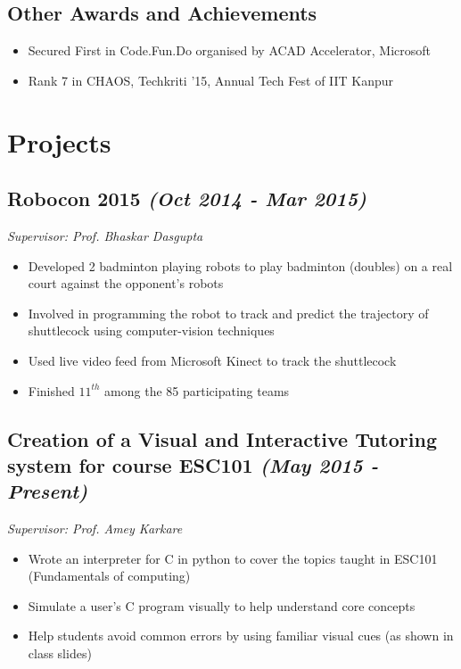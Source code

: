 \documentclass[8pt]{extreport}
\begin{document}
        \subsection*{Other Awards and Achievements}
        \begin{itemize}
                \item Secured First in Code.Fun.Do organised by ACAD Accelerator, Microsoft
                \item Rank 7 in CHAOS, Techkriti '15, Annual Tech Fest of IIT Kanpur
        \end{itemize}
    \section*{Projects}
        \hrulefill
        \subsection*{Robocon 2015 \hfill \textit{\small{(Oct 2014 - Mar 2015)}}}
        \textit{Supervisor: Prof. Bhaskar Dasgupta}
        \begin{itemize}
            \item Developed 2 badminton playing robots to play badminton (doubles) on a real court against the opponent's robots
            \item Involved in programming the robot to track and predict the trajectory of shuttlecock using computer-vision techniques
            \item Used live video feed from Microsoft Kinect to track the shuttlecock
            \item Finished $11^{th}$ among the 85 participating teams
        \end{itemize}
        \subsection*{Creation of a Visual and Interactive Tutoring system for course ESC101 \hfill \textit{\small{(May 2015 - Present)}}}
        \textit{Supervisor: Prof. Amey Karkare}
        \begin{itemize}
                \item Wrote an interpreter for C in python to cover the topics taught in ESC101 (Fundamentals of computing)
                \item Simulate a user's C program visually to help understand core concepts
                \item Help students avoid common errors by using familiar visual cues (as shown in class slides)
        \end{itemize}
\end{document}
